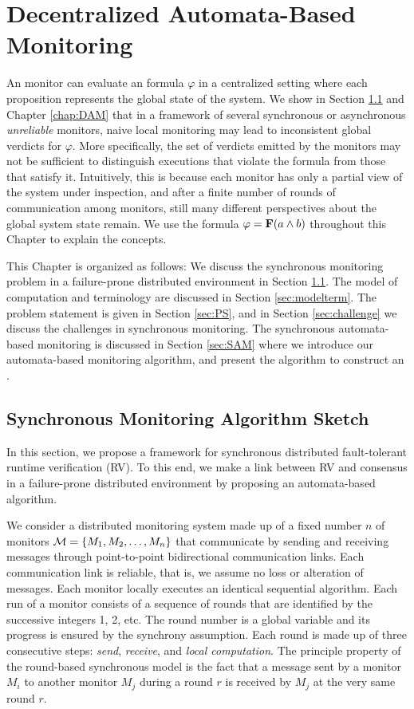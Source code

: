 
\chapter{Decentralized Automata-Based Monitoring}
\label{chap:extended monitor}

An \LTLtri monitor can evaluate an \LTL formula $\varphi$ in a centralized 
setting where each proposition represents the global state of the system. We 
show in Section \ref{sec:DSM} and Chapter \ref{chap:DAM} that in a framework of several synchronous or asynchronous 
{\em unreliable} monitors, naive local monitoring may lead to inconsistent 
global verdicts for $\varphi$. More specifically, the set of verdicts emitted by 
the monitors may not be sufficient to distinguish executions that violate the 
formula from those that satisfy it. Intuitively, this is because each monitor 
has only a partial view of the system under inspection, and after a finite 
number of rounds of communication among monitors, still many different 
perspectives about the global system state remain. We use the \LTL formula 
$\varphi = \mathbf{F} (a \wedge b)$ throughout this Chapter to explain the concepts.

This Chapter is organized as follows: We discuss the synchronous monitoring problem in a failure-prone distributed environment in Section \ref{sec:DSM}. The model of computation and terminology are discussed in Section \ref{sec:modelterm}. The problem statement is given in Section \ref{sec:PS}, and in Section \ref{sec:challenge} we discuss the challenges in synchronous monitoring. The synchronous automata-based monitoring is discussed in Section \ref{sec:SAM} where we introduce our automata-based monitoring algorithm, and present the algorithm to construct an \Exltl.



\section{Synchronous Monitoring Algorithm Sketch}
\label{sec:DSM}

In this section, we propose a framework for synchronous distributed 
fault-tolerant runtime verification (RV). To this end, we make a link between 
RV and consensus in a failure-prone distributed environment by 
proposing an automata-based algorithm.

We consider a distributed monitoring system made up of a fixed number $n$ of 
monitors $\mathcal{M} = \{M_1, M_2, \dots, M_n\}$ that communicate by sending and 
receiving messages through point-to-point bidirectional communication links. 
Each communication link is reliable, that is, we assume no loss or alteration 
of messages. Each monitor locally executes an identical sequential algorithm. 
Each run of a monitor consists of a sequence of rounds that are identified by 
the successive integers 1, 2, etc. The round number is a global variable and 
its progress is ensured by the synchrony assumption. Each round is made up of 
three consecutive steps: {\em send}, {\em receive}, and {\em local 
computation}. The principle property of the round-based synchronous model is the 
fact that a message sent by a monitor $M_i$ to another monitor $M_j$ during a 
round $r$ is received by $M_j$ at the very same round $r$.

